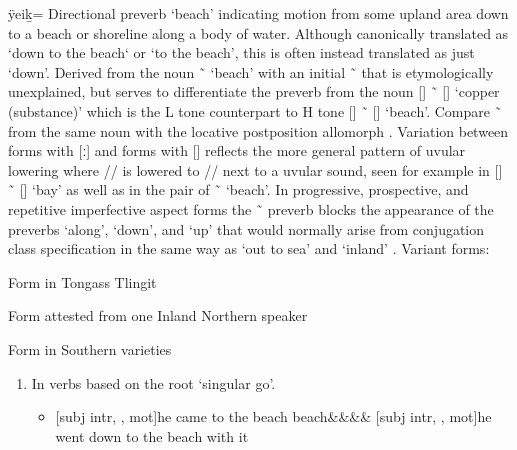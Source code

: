 \begin{morphdesc}[resume*=alphalist]
\item[ÿeiḵ=]\label{m:ÿeiḵ=}
	Directional preverb ‘beach’ indicating motion from some upland area down to a beach
		or shoreline along a body of water.
	Although canonically translated as ‘down to the beach‘ or ‘to the beach’, this is often
		instead translated as just ‘down’.
	Derived from the noun  \~\  ‘beach’
		with an initial  \~\  that is etymologically unexplained,
		but serves to differentiate the preverb from the noun
		 [] \~\  [] ‘copper (substance)’
		which is the L tone counterpart
		to H tone  [] \~\  [] ‘beach’.
	Compare  \~\  from the same noun with the locative postposition
		allomorph .
	Variation between forms with  [ː] and forms with  []
		reflects the more general pattern of uvular lowering where  //
		is lowered to  // next to a uvular sound, seen for example in
		 [] \~\  [] ‘bay’ as well as in the
		pair of  \~\  ‘beach’.
	In progressive, prospective, and repetitive imperfective aspect forms the
		 \~\  preverb blocks the appearance of
		the preverbs  ‘along’,  ‘down’, and  ‘up’
		that would normally arise from conjugation class specification
		in the same way as  ‘out to sea’ and  ‘inland’
		\parencite[136]{leer:1991}.
	\newline
	Variant forms:
	\begin{allolist}
	\item[{\X[eeḵ=]{eèḵ=}}]
		Form in Tongass Tlingit
	\item[\X{eiḵ=}]
		Form attested from one Inland Northern speaker
	\item[\X{ÿeeḵ=}]
		Form in Southern varieties
	\end{allolist}
	\begin{enumerate}
	\item	\label{item:ÿeiḵ=beach-gosg}
		In verbs based on the root  ‘singular go’.
		\begin{itemize}
		\item	{}[subj intr, , mot]{he came to the beach}
			\parencite[268.9]{swanton:1909}
					{beach&&&&\·}
			\versus {}[subj intr, , mot]{he went down to the beach with it}
			\parencite[263.4]{swanton:1909}

\end{itemize}
\end{enumerate}
\end{morphdesc}
